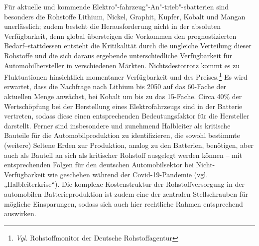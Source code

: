 \documentclass[12pt,a4paper,oneside]{book} %
\begin{document}
Für aktuelle und kommende Elektro"-fahrzeug"-An"-trieb"-sbatterien sind besonders die Rohstoffe Lithium, Nickel, Graphit, Kupfer, Kobalt und Mangan unerlässlich; zudem besteht die Herausforderung nicht in der absoluten Verfügbarkeit, denn global übersteigen die Vorkommen den prognostizierten Bedarf\autocite{thielmann_batterien_2020}--stattdessen entsteht die Kritikalität durch die ungleiche Verteilung dieser Rohstoffe und die sich daraus ergebende unterschiedliche Verfügbarkeit für Automobilhersteller in verschiedenen Märkten. Nichtsdestotrotz kommt es zu Fluktuationen hinsichtlich momentaner Verfügbarkeit und des Preises.\footnote{\textit{Vgl.} Rohstoffmonitor der Deutsche Rohstoffagentur} Es wird erwartet, dass die Nachfrage nach Lithium bis 2050 auf das 60-Fache der aktuellen Menge anwächst, bei Kobalt um bis zu das 15-Fache.\autocite[2]{europaisches_parlament_securing_2023} Circa 40\% der Wertschöpfung bei der Herstellung eines Elektrofahrzeugs sind in der Batterie vertreten, sodass diese einen entsprechenden Bedeutungsfaktor für die Hersteller darstellt.\autocite{bundesministerium_fur_wirtschaft_und_klimaschutz_bmwk_batterien_2020} Ferner sind insbesondere und zunehmend Halbleiter als kritische Bauteile für die Automobilproduktion zu identifizieren, die sowohl bestimmte (weitere) Seltene Erden zur Produktion, analog zu den Batterien, benötigen, aber auch als Bauteil an sich als kritischer Rohstoff ausgelegt werden können – mit entsprechenden Folgen für den deutschen Automobilsektor bei Nicht-Verfügbarkeit wie geschehen während der Covid-19-Pandemie (vgl. „Halbleiterkrise“).\autocite[77]{frieske_zukunftsfahige_2022} Die komplexe Kostenstruktur der Rohstoffversorgung in der automobilen Batterieproduktion ist zudem eine der zentralen Stellschrauben für mögliche Einsparungen,\autocite{proff_key_2023} sodass sich auch hier rechtliche Rahmen entsprechend auswirken.
\end{document}
